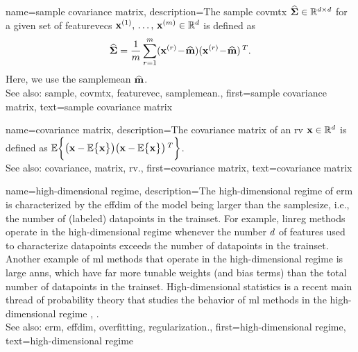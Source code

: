 	
{name={sample covariance matrix}, 
	description={The 
		\gls{sample} \gls{covmtx} $\widehat{\bf \Sigma} \in \mathbb{R}^{d \times d}$ 
		for a given set of \glspl{featurevec} ${\bf x}^{(1)}, \,\ldots, \,{\bf x}^{(m)} \in \mathbb{R}^{d}$ is defined as 
		$$\widehat{\bf \Sigma} = \frac{1}{m} \sum_{r=1}^{m} ({\bf x}^{(r)}\!-\!\widehat{{\bf m}}) ({\bf x}^{(r)}\!-\!\widehat{{\bf m}})\,^{T}.$$ 
		Here, we use the \gls{samplemean} $\widehat{{\bf m}}$. 
				\\
		See also: \gls{sample}, \gls{covmtx}, \gls{featurevec}, \gls{samplemean}.},
	first={sample covariance matrix},
	text={sample covariance matrix} 
}

{name={covariance matrix}, 
	description={The \gls{covariance} \gls{matrix} of an \gls{rv} ${\bf x} \in \mathbb{R}^{d}$ 
		is defined as $\mathbb{E} \bigg \{ \big( {\bf x} - \mathbb{E} \big\{ {\bf x} \big\} \big)  \big({\bf x} - \mathbb{E} \big\{ {\bf x} \big\} \big)\,^{T} \bigg\}$.
				\\
		See also: \gls{covariance}, \gls{matrix}, \gls{rv}.},
	first={covariance matrix},
	text={covariance matrix} 
}
	
{name={high-dimensional regime}, 
	description={The 
		high-dimensional regime of \gls{erm} is characterized by the \gls{effdim} of the \gls{model} 
		being larger than the \gls{samplesize}, i.e., the number of (labeled) \glspl{datapoint} in the \gls{trainset}. 
		For example, \gls{linreg} methods operate in the high-dimensional regime whenever the number $d$ of \glspl{feature} 
		used to characterize \glspl{datapoint} exceeds the number of \glspl{datapoint} in the \gls{trainset}. 
		Another example of \gls{ml} methods that operate in the high-dimensional regime is large \glspl{ann}, which have 
		far more tunable \gls{weights} (and bias terms) than the total number of \glspl{datapoint} in the \gls{trainset}. 
		High-dimensional statistics is a recent main thread of \gls{probability} theory that studies the 
		behavior of \gls{ml} methods in the high-dimensional regime \cite{Wain2019}, \cite{BuhlGeerBook}.
				\\
		See also: \gls{erm}, \gls{effdim}, \gls{overfitting}, \gls{regularization}.},
   	first={high-dimensional regime},
	text={high-dimensional regime} 
}

